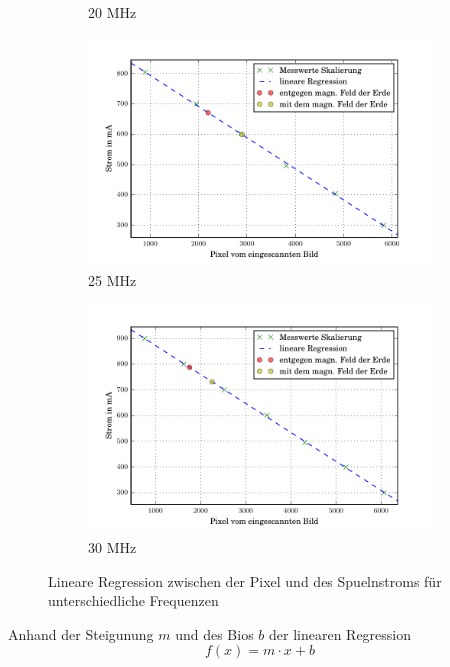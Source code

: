 \begin{figure}
\begin{subfigure}[b]{0.49\textwidth}
     \caption{20 MHz}
     \label{fig:20Reg}
  \end{subfigure}
  \begin{subfigure}[b]{0.49\textwidth}
     \includegraphics[width=\textwidth]{picture/25MHz.pdf}
     \caption{25 MHz}
     \label{fig:20Reg}
  \end{subfigure}
  \begin{subfigure}[b]{0.49\textwidth}
     \includegraphics[width=\textwidth]{picture/30MHz.pdf}
     \caption{30 MHz}
     \label{fig:30Reg}
  \end{subfigure}
  \caption{Lineare Regression zwischen der Pixel und des Spuelnstroms für unterschiedliche Frequenzen}
  \label{fig:Reg}
\end{figure}
Anhand der Steigunung $m$ und des Bios $b$ der linearen Regression
\begin{equation}
  f(x) = m \cdot x + b
  \label{eqn:Reg}
\end{equation}
